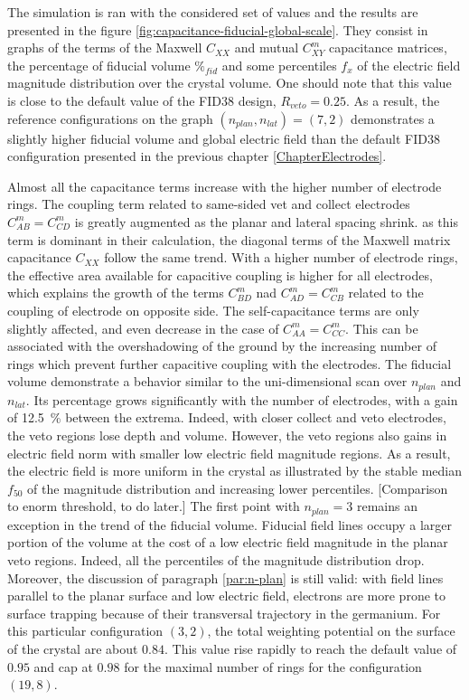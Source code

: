 The simulation is ran with the considered set of values and the results are presented in the figure \ref{fig:capacitance-fiducial-global-scale}.  They consist in graphs of the terms of the Maxwell $C_{XX}$ and mutual $C_{XY}^m$ capacitance matrices, the percentage of fiducial volume $\%_{fid}$ and some percentiles $f_x$ of the electric field magnitude distribution over the crystal volume.
One should note that this value is close to the default value of the FID38 design, $R_{veto}=0.25$. As a result, the reference configurations on the graph $\left( n_{plan}, n_{lat} \right) = (7,2)$ demonstrates a slightly higher fiducial volume and global electric field than the default FID38 configuration presented in the previous chapter \ref{ChapterElectrodes}.

Almost all the capacitance terms increase with the higher number of electrode rings. The coupling term related to same-sided vet and collect electrodes $C_{AB}^m=C_{CD}^m$ is greatly augmented as the planar and lateral spacing shrink. as this term is dominant in their calculation, the diagonal terms of the Maxwell matrix capacitance $C_{XX}$ follow the same trend. With a higher number of electrode rings, the effective area available for capacitive coupling is higher for all electrodes, which explains the growth of the terms $C_{BD}^m$ nad $C_{AD}^m=C_{CB}^m$ related to the coupling of electrode on opposite side. The self-capacitance terms are only slightly affected, and even decrease in the case of $C_{AA}^m=C_{CC}^m$. This can be associated with the overshadowing of the ground by the increasing number of rings which prevent further capacitive coupling with the electrodes.
The fiducial volume demonstrate a behavior similar to the uni-dimensional scan over $n_{plan}$ and $n_{lat}$. Its percentage grows significantly with the number of electrodes, with a gain of \SI{12.5}{\percent} between the extrema. 
Indeed, with closer collect and veto electrodes, the veto regions lose depth and volume. However, the veto regions also gains in electric field norm with smaller low electric field magnitude regions. As a result, the electric field is more uniform in the crystal as illustrated by the stable median $f_{50}$ of the magnitude distribution and increasing lower percentiles.
{\color{red} [Comparison to enorm threshold, to do later.]}
The first point with $n_{plan} = 3$ remains an exception in the trend of the fiducial volume. Fiducial field lines occupy a larger portion of the volume at the cost of a low electric field magnitude in the planar veto regions. Indeed, all the percentiles of the magnitude distribution drop. Moreover, the discussion of paragraph \ref{par:n-plan} is still valid: with field lines parallel to the planar surface and low electric field, electrons are more prone to surface trapping because of their transversal trajectory in the germanium.
For this particular configuration $(3,2)$, the total weighting potential on the surface of the crystal are about $0.84$. This value rise rapidly to reach the default value of $0.95$ and cap at $0.98$ for the maximal number of rings for the configuration $(19,8)$.

